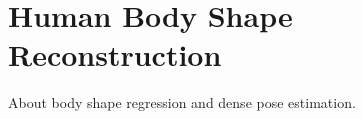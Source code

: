 \section{Human Body Shape Reconstruction}
\label{sec:body_reconstruction}

About body shape regression and dense pose estimation.
